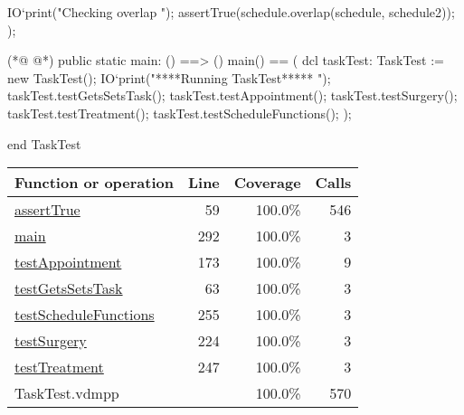 \begin{vdmpp}[breaklines=true]
   IO`print("\n Checking overlap \n");
   assertTrue(schedule.overlap(schedule, schedule2));
  );
  
(*@
\label{main:292}
@*)
  public static main: () ==> ()
   main() == (
    dcl taskTest: TaskTest := new TaskTest();
    IO`print("\n\n *****Running TaskTest***** \n");
    taskTest.testGetsSetsTask();
    taskTest.testAppointment();
    taskTest.testSurgery();
    taskTest.testTreatment();
    taskTest.testScheduleFunctions();
   );

end TaskTest
\end{vdmpp}
\bigskip
\begin{longtable}{|l|r|r|r|}
\hline
Function or operation & Line & Coverage & Calls \\
\hline
\hline
\hyperref[assertTrue:59]{assertTrue} & 59&100.0\% & 546 \\
\hline
\hyperref[main:292]{main} & 292&100.0\% & 3 \\
\hline
\hyperref[testAppointment:173]{testAppointment} & 173&100.0\% & 9 \\
\hline
\hyperref[testGetsSetsTask:63]{testGetsSetsTask} & 63&100.0\% & 3 \\
\hline
\hyperref[testScheduleFunctions:255]{testScheduleFunctions} & 255&100.0\% & 3 \\
\hline
\hyperref[testSurgery:224]{testSurgery} & 224&100.0\% & 3 \\
\hline
\hyperref[testTreatment:247]{testTreatment} & 247&100.0\% & 3 \\
\hline
\hline
TaskTest.vdmpp & & 100.0\% & 570 \\
\hline
\end{longtable}

